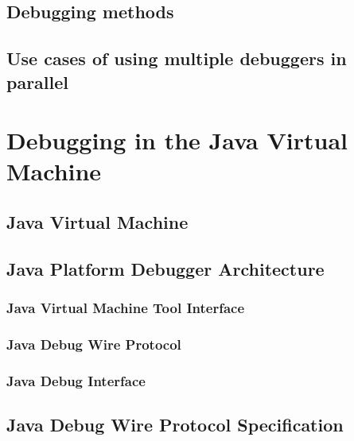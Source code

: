 \documentclass{style/bachelor-thesis}
\begin{document}
\subsection{Debugging methods}
\label{sec:debugging_methods}


\subsection{Use cases of using multiple debuggers in parallel}
\label{sec:debugging_usecases}


\pagebreak

\section{Debugging in the Java Virtual Machine}
\label{sec:jvm_debugging}
 

\subsection{Java Virtual Machine}
\label{sec:jvm}


\subsection{Java Platform Debugger Architecture}
\label{sec:jpda}


\subsubsection{Java Virtual Machine Tool Interface}
\label{sec:jvmti}


\subsubsection{Java Debug Wire Protocol}
\label{sec:jdwp}


\subsubsection{Java Debug Interface}
\label{sec:jdi}


\subsection{Java Debug Wire Protocol Specification}
\label{sec:jdwp_spec}

\end{document}
